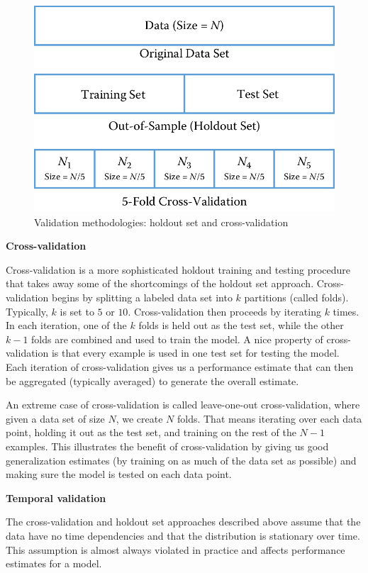 \documentclass[]{krantz}
\begin{document}
\begin{figure}

{\centering \includegraphics[width=0.7\linewidth]{ChapterML/figures/holdout} 

}

\caption{Validation methodologies: holdout set and cross-validation}\label{fig:holdout}
\end{figure}

\textbf{Cross-validation}

Cross-validation is a more sophisticated holdout training and testing
procedure that takes away some of the shortcomings of the holdout set
approach. Cross-validation begins by splitting a labeled data set into
\(k\) partitions (called folds). Typically, \(k\) is set to \(5\) or
\(10\). Cross-validation then proceeds by iterating \(k\) times. In each
iteration, one of the \(k\) folds is held out as the test set, while the
other \(k-1\) folds are combined and used to train the model. A nice
property of cross-validation is that every example is used in one test
set for testing the model. Each iteration of cross-validation gives us a
performance estimate that can then be aggregated (typically averaged) to
generate the overall estimate.

An extreme case of cross-validation is called leave-one-out
cross-validation, where given a data set of size \(N\), we create \(N\)
folds. That means iterating over each data point, holding it out as the
test set, and training on the rest of the \(N-1\) examples. This
illustrates the benefit of cross-validation by giving us good
generalization estimates (by training on as much of the data set as
possible) and making sure the model is tested on each data point.

\textbf{Temporal validation}

\hspace*{4pt} The cross-validation and holdout set approaches described
above assume that the data have no time dependencies and that the
distribution is stationary over time. This assumption is almost always
violated in practice and affects performance estimates for a model.
\end{document}
